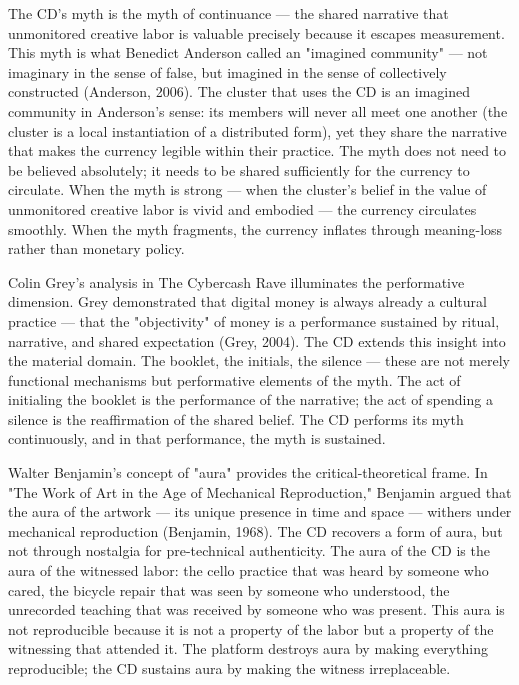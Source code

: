 The CD's myth is the myth of continuance — the shared narrative that unmonitored creative labor is valuable precisely because it escapes measurement. This myth is what Benedict Anderson called an "imagined community" — not imaginary in the sense of false, but imagined in the sense of collectively constructed (Anderson, 2006). The cluster that uses the CD is an imagined community in Anderson's sense: its members will never all meet one another (the cluster is a local instantiation of a distributed form), yet they share the narrative that makes the currency legible within their practice. The myth does not need to be believed absolutely; it needs to be shared sufficiently for the currency to circulate. When the myth is strong — when the cluster's belief in the value of unmonitored creative labor is vivid and embodied — the currency circulates smoothly. When the myth fragments, the currency inflates through meaning-loss rather than monetary policy.

Colin Grey's analysis in The Cybercash Rave illuminates the performative dimension. Grey demonstrated that digital money is always already a cultural practice — that the "objectivity" of money is a performance sustained by ritual, narrative, and shared expectation (Grey, 2004). The CD extends this insight into the material domain. The booklet, the initials, the silence — these are not merely functional mechanisms but performative elements of the myth. The act of initialing the booklet is the performance of the narrative; the act of spending a silence is the reaffirmation of the shared belief. The CD performs its myth continuously, and in that performance, the myth is sustained.

Walter Benjamin's concept of "aura" provides the critical-theoretical frame. In "The Work of Art in the Age of Mechanical Reproduction," Benjamin argued that the aura of the artwork — its unique presence in time and space — withers under mechanical reproduction (Benjamin, 1968). The CD recovers a form of aura, but not through nostalgia for pre-technical authenticity. The aura of the CD is the aura of the witnessed labor: the cello practice that was heard by someone who cared, the bicycle repair that was seen by someone who understood, the unrecorded teaching that was received by someone who was present. This aura is not reproducible because it is not a property of the labor but a property of the witnessing that attended it. The platform destroys aura by making everything reproducible; the CD sustains aura by making the witness irreplaceable.

